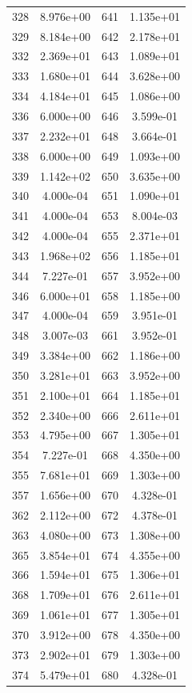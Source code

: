 \documentclass[12pt]{article}
\begin{document}
\begin{longtable}{@{}cccc@{}}
328 & 8.976e+00 & 641 & 1.135e+01 \\
329 & 8.184e+00 & 642 & 2.178e+01 \\
332 & 2.369e+01 & 643 & 1.089e+01 \\
333 & 1.680e+01 & 644 & 3.628e+00 \\
334 & 4.184e+01 & 645 & 1.086e+00 \\
336 & 6.000e+00 & 646 & 3.599e-01 \\
337 & 2.232e+01 & 648 & 3.664e-01 \\
338 & 6.000e+00 & 649 & 1.093e+00 \\
339 & 1.142e+02 & 650 & 3.635e+00 \\
340 & 4.000e-04 & 651 & 1.090e+01 \\
341 & 4.000e-04 & 653 & 8.004e-03 \\
342 & 4.000e-04 & 655 & 2.371e+01 \\
343 & 1.968e+02 & 656 & 1.185e+01 \\
344 & 7.227e-01 & 657 & 3.952e+00 \\
346 & 6.000e+01 & 658 & 1.185e+00 \\
347 & 4.000e-04 & 659 & 3.951e-01 \\
348 & 3.007e-03 & 661 & 3.952e-01 \\
349 & 3.384e+00 & 662 & 1.186e+00 \\
350 & 3.281e+01 & 663 & 3.952e+00 \\
351 & 2.100e+01 & 664 & 1.185e+01 \\
352 & 2.340e+00 & 666 & 2.611e+01 \\
353 & 4.795e+00 & 667 & 1.305e+01 \\
354 & 7.227e-01 & 668 & 4.350e+00 \\
355 & 7.681e+01 & 669 & 1.303e+00 \\
357 & 1.656e+00 & 670 & 4.328e-01 \\
362 & 2.112e+00 & 672 & 4.378e-01 \\
363 & 4.080e+00 & 673 & 1.308e+00 \\
365 & 3.854e+01 & 674 & 4.355e+00 \\
366 & 1.594e+01 & 675 & 1.306e+01 \\
368 & 1.709e+01 & 676 & 2.611e+01 \\
369 & 1.061e+01 & 677 & 1.305e+01 \\
370 & 3.912e+00 & 678 & 4.350e+00 \\
373 & 2.902e+01 & 679 & 1.303e+00 \\
374 & 5.479e+01 & 680 & 4.328e-01 \\

\end{longtable}
\end{document}
